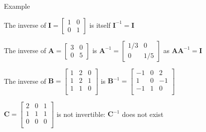 \documentclass{scrartcl}
\newcommand{\vv}[1]{\boldsymbol{#1}}
\begin{document}
\begin{frame}{Example}
\protect\hypertarget{example-1}{}

The inverse of \(\vv{I} = \begin{bmatrix} 1 &0 \\ 0 & 1 \end{bmatrix}\)
is itself \(\vv{I}^{-1} =\vv{I}\)

\bigskip

The inverse of \(\vv{A} = \begin{bmatrix} 3& 0 \\ 0 & 5\end{bmatrix}\)
is \(\vv{A}^{-1} = \begin{bmatrix} 1/3& 0 \\ 0 & 1/5\end{bmatrix}\) as
\(\vv{AA}^{-1} = \vv{I}\)

\bigskip

The inverse of
\(\vv{B} = \begin{bmatrix}1&2&0 \\1&2&1 \\1&1&0 \\\end{bmatrix}\) is
\(\vv{B}^{-1}=\begin{bmatrix}-1&0&2 \\1&0&-1 \\-1&1&0 \\\end{bmatrix}\)
\bigskip

\(\vv{C} = \begin{bmatrix}2&0&1 \\1&1&1 \\0&0&0 \\\end{bmatrix}\) is not
invertible: \(\vv{C}^{-1}\) does not exist

\end{frame}
\end{document}
